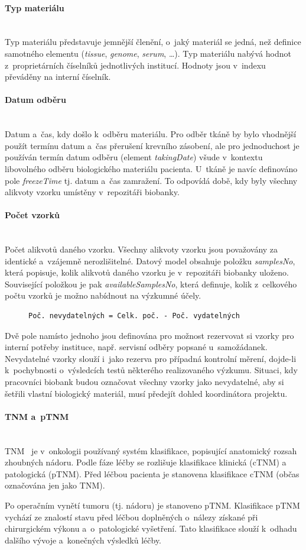 \documentclass[11pt, final, oneside]{fithesis2}
\newcommand{\paragraphNewLine}[1]{\paragraph*{#1}\mbox{}\\}
\begin{document}
\paragraphNewLine{Typ materiálu}
Typ materiálu představuje jemnější členění, o~jaký materiál se jedná, než definice samotného elementu (\textit{tissue}, \textit{genome}, \textit{serum}, \ldots). Typ materiálu nabývá hodnot z~proprietárních číselníků jednotlivých institucí. Hodnoty jsou v~indexu převáděny na interní číselník.
		
\paragraphNewLine{Datum odběru}
Datum a~čas, kdy došlo k~odběru materiálu. Pro odběr tkáně by bylo vhodnější použít termínu datum a~čas přerušení krevního zásobení, ale pro jednoduchost je používán termín datum odběru (element \textit{takingDate}) všude v~kontextu libovolného odběru biologického materiálu pacienta.
U~tkáně je navíc definováno pole \textit{freezeTime} tj. datum a~čas zamražení. To odpovídá době, kdy byly všechny alikvoty vzorku umístěny v~repozitáři biobanky.

\paragraphNewLine{Počet vzorků}
Počet alikvotů daného vzorku. Všechny alikvoty vzorku jsou považovány za identické a~vzájemně nerozlišitelné. 
Datový model obsahuje položku \textit{samplesNo}, která popisuje, kolik alikvotů daného vzorku je v~repozitáři biobanky uloženo. Související položkou je pak \textit{availableSamplesNo}, která definuje, kolik z~celkového počtu vzorků je možno nabídnout na výzkumné účely.

\begin{figure}[h!] %
\centering
\begin{BVerbatim}
Poč. nevydatelných = Celk. poč. - Poč. vydatelných
\end{BVerbatim}
\end{figure}
Dvě pole namísto jednoho jsou definována pro možnost rezervovat si vzorky pro interní potřeby instituce, např. servisní odběry popsané u~samožádanek. Nevydatelné vzorky slouží i~jako rezerva pro případná kontrolní měrení, dojde-li k~pochybnosti o~výsledcích testů některého realizovaného výzkumu.
Situaci, kdy pracovníci biobank budou označovat všechny vzorky jako nevydatelné, aby si šetřili vlastní biologický materiál, musí předejít dohled koordinátora projektu. 

\paragraphNewLine{TNM a~pTNM}
TNM~\cite{TNM} je v~onkologii používaný systém klasifikace, popisující anatomický rozsah zhoubných nádoru. Podle fáze léčby se rozlišuje klasifikace klinická (cTNM) a patologická (pTNM). Před léčbou pacienta je stanovena klasifikace cTNM (občas označována jen jako TNM).

Po operačním vynětí tumoru (tj. nádoru) je stanoveno pTNM. Klasifikace pTNM vychází ze znalostí stavu před léčbou doplněných o~nálezy získané při chirurgickém výkonu a~o~patologické vyšetření. Tato klasifikace slouží k~odhadu dalšího vývoje a~konečných výsledků léčby. 
\end{document}
